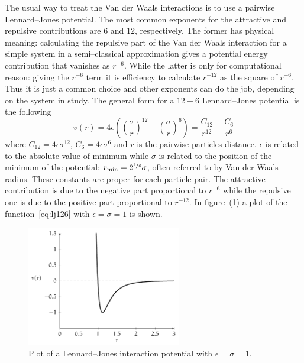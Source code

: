 The usual way to treat the Van der Waals interactions is to use a pairwise Lennard--Jones potential. The most
common exponents for the attractive and repulsive contributions are $6$ and $12$, respectively. The former has
physical meaning: calculating the repulsive part of the Van der Waals interaction for a simple system in a
semi--classical approximation gives a potential energy contribution that vanishes as $r^{-6}$. While the latter
is only for computational reason: giving the $r^{-6}$ term it is efficiency to calculate $r^{-12}$ as the square
of $r^{-6}$. Thus it is just a common choice and other exponents can do the job, depending on the system in
study. The general form for a $12-6$ Lennard--Jones potential is the following
\begin{equation}
	v(r) = 4\epsilon\left ( \left ( \frac{\sigma}{r}\right )^{12}  - \left ( \frac{\sigma}{r} \right )^6 \right ) = \frac{C_{12}}{r^{12}} - \frac{C_{6}}{r^{6}}
	\label{eq:lj126}
\end{equation}
where $C_{12} = 4\epsilon\sigma^{12}$, $C_{6} = 4\epsilon\sigma^{6}$ and $r$ is the pairwise particles distance.
$\epsilon$ is related to the absolute value of minimum while $\sigma$ is related to the position of the minimum
of the potential: $r_{\text{min}} = 2^{\nicefrac{1}{6}}\sigma$, often referred to by Van der Waals radius. These
constants are proper for each particle pair. The attractive contribution is due to the negative part proportional
to $r^{-6}$ while the repulsive one is due to the positive part proportional to $r^{-12}$. In
figure~(\ref{fig:LG12511}) a plot of the function~\eqref{eq:lj126} with $\epsilon = \sigma = 1$ is shown.
\begin{figure}[!ht]
\centering
	\includegraphics[width=0.6\textwidth]{./img/LJ126/LJ126}
	\caption{Plot of a Lennard--Jones interaction potential with $\epsilon = \sigma = 1$.}
	\label{fig:LG12511}
\end{figure}

